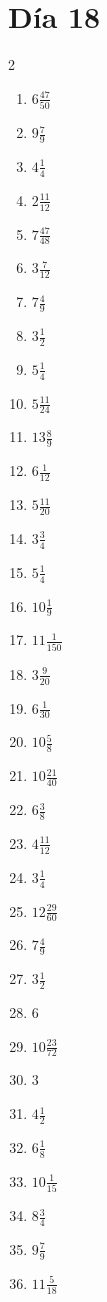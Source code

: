 \documentclass[12pt]{article}
\begin{document}
\section*{Día 18}
\begin{multicols}{2}\begin{enumerate}
\item $ 6 \frac{47}{50} $
\item $ 9 \frac{7}{9} $
\item $ 4 \frac{1}{4} $
\item $ 2 \frac{11}{12} $
\item $ 7 \frac{47}{48} $
\item $ 3 \frac{7}{12} $
\item $ 7 \frac{4}{9} $
\item $ 3 \frac{1}{2} $
\item $ 5 \frac{1}{4} $
\item $ 5 \frac{11}{24} $
\item $ 13 \frac{8}{9} $
\item $ 6 \frac{1}{12} $
\item $ 5 \frac{11}{20} $
\item $ 3 \frac{3}{4} $
\item $ 5 \frac{1}{4} $
\item $ 10 \frac{1}{9} $
\item $ 11 \frac{1}{150} $
\item $ 3 \frac{9}{20} $
\item $ 6 \frac{1}{30} $
\item $ 10 \frac{5}{8} $
\item $ 10 \frac{21}{40} $
\item $ 6 \frac{3}{8} $
\item $ 4 \frac{11}{12} $
\item $ 3 \frac{1}{4} $
\item $ 12 \frac{29}{60} $
\item $ 7 \frac{4}{9} $
\item $ 3 \frac{1}{2} $
\item $ 6 $
\item $ 10 \frac{23}{72} $
\item $ 3 $
\item $ 4 \frac{1}{2} $
\item $ 6 \frac{1}{8} $
\item $ 10 \frac{1}{15} $
\item $ 8 \frac{3}{4} $
\item $ 9 \frac{7}{9} $
\item $ 11 \frac{5}{18} $

\end{enumerate}
\end{multicols}
\end{document}
